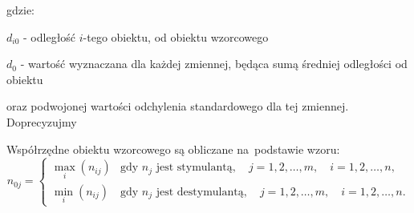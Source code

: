 \documentclass[12pt,a4paper]{report}
\begin{document}
gdzie:

$d_{i0}$ - odległość $i$-tego obiektu, od obiektu wzorcowego

$d_{0}$ - wartość wyznaczana dla każdej zmiennej, będąca sumą średniej odległości od obiektu

 oraz podwojonej wartości odchylenia standardowego dla tej zmiennej. Doprecyzujmy

Współrzędne obiektu wzorcowego są obliczane na~podstawie wzoru:
$$n_{0j}=\left\{ \begin{array}{ll}
\max\limits_{i} (n_{ij}) & \textrm{gdy } n_{j} \textrm{ jest stymulantą},\quad j=1,2,\dots,m, \quad i=1,2,\dots,n, \\
\min\limits_{i} (n_{ij}) & \textrm{gdy } n_{j} \textrm{ jest destymulantą}, \quad j=1,2,\dots,m, \quad i=1,2,\dots,n.
\end{array} \right. $$
\end{document}

